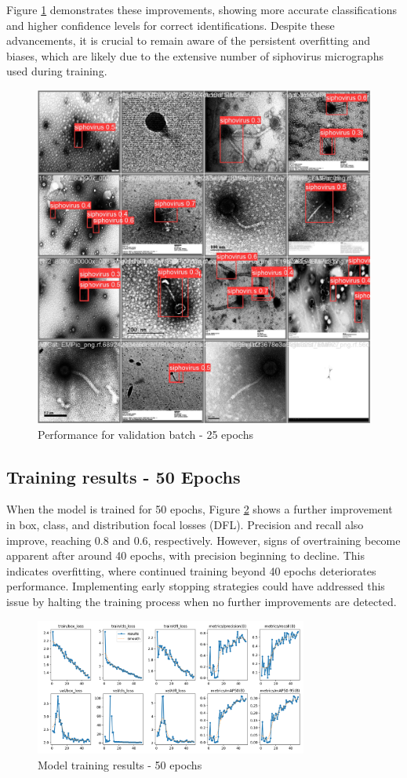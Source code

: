 \documentclass[runningheads]{llncs}
\begin{document}
Figure \ref{fig10} demonstrates these improvements, showing more accurate classifications and higher confidence levels for correct identifications. Despite these advancements, it is crucial to remain aware of the persistent overfitting and biases, which are likely due to the extensive number of siphovirus micrographs used during training.

\begin{figure}
\begin{center}
\includegraphics[width=.4\textwidth]{./figures/fig10_25e_val_batch0_pred.jpg}
\caption{Performance for validation batch - 25 epochs} \label{fig10}
\end{center}
\end{figure}

\subsection{Training results - 50 Epochs}

When the model is trained for 50 epochs, Figure \ref{fig11} shows a further improvement in box, class, and distribution focal losses (DFL). Precision and recall also improve, reaching 0.8 and 0.6, respectively. However, signs of overtraining become apparent after around 40 epochs, with precision beginning to decline. This indicates overfitting, where continued training beyond 40 epochs deteriorates performance. Implementing early stopping strategies could have addressed this issue by halting the training process when no further improvements are detected.

\begin{figure}[H]
\begin{center}
\includegraphics[width=0.8\textwidth]{./figures/fig11_50e_results.png}
\caption{Model training results - 50 epochs} \label{fig11}
\end{center}
\end{figure}
\end{document}
